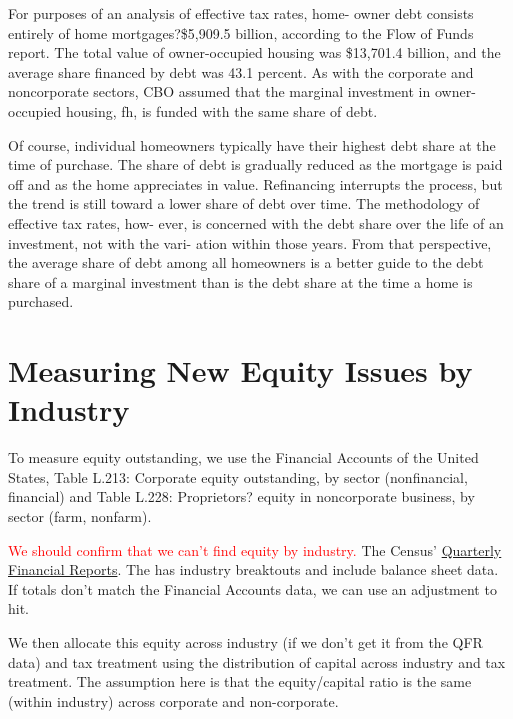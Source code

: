 \documentclass[article,11pt,letterpaper,fleqn]{article}
\theoremstyle{definition}
\numberwithin{equation}{section}
\begin{document}
For purposes of an analysis of effective tax rates, home- owner debt consists entirely of home mortgages?\$5,909.5 billion, according to the Flow of Funds report. The total value of owner-occupied housing was \$13,701.4 billion, and the average share financed by debt was 43.1 percent. As with the corporate and noncorporate sectors, CBO assumed that the marginal investment in owner- occupied housing, fh, is funded with the same share of debt.

Of course, individual homeowners typically have their highest debt share at the time of purchase. The share of debt is gradually reduced as the mortgage is paid off and as the home appreciates in value. Refinancing interrupts the process, but the trend is still toward a lower share of debt over time. The methodology of effective tax rates, how- ever, is concerned with the debt share over the life of an investment, not with the vari- ation within those years. From that perspective, the average share of debt among all homeowners is a better guide to the debt share of a marginal investment than is the debt share at the time a home is purchased.

\section{Measuring New Equity Issues by Industry}
\label{sec:step3}

To measure equity outstanding, we use the Financial Accounts of the United States, Table L.213: Corporate equity outstanding, by sector (nonfinancial, financial) and Table L.228: Proprietors? equity in noncorporate business, by sector (farm, nonfarm).

\textcolor{red}{We should confirm that we can't find equity by industry.}  The Census' \href{http://www.census.gov/econ/qfr/}{Quarterly Financial Reports}. The has industry breaktouts and include balance sheet data.  If totals don't match the Financial Accounts data, we can use an adjustment to hit.

We then allocate this equity across industry (if we don't get it from the QFR data) and tax treatment using the distribution of capital across industry and tax treatment.  The assumption here is that the equity/capital ratio is the same (within industry) across corporate and non-corporate.

%
%
%
%
%
\end{document}
